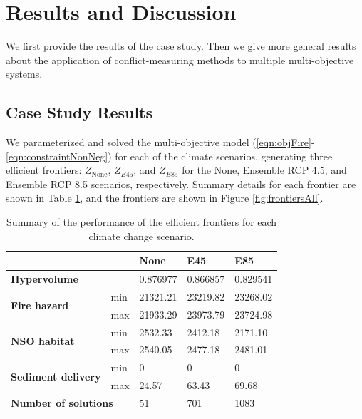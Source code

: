 \section{Results and Discussion}
\label{sec:results}
We first provide the results of the case study. Then we give more general results about the application of conflict-measuring methods to multiple multi-objective systems.

\subsection{Case Study Results}
We parameterized and solved the multi-objective model (\eqref{eqn:objFire}-\eqref{eqn:constraintNonNeg}) for each of the climate scenarios, generating three efficient frontiers: $Z_{\text{None}}$, $Z_{E45}$, and $Z_{E85}$ for the None, Ensemble RCP 4.5, and Ensemble RCP 8.5 scenarios, respectively. Summary details for each frontier are shown in Table \ref{tab:frontiersSummary}, and the frontiers are shown in Figure \ref{fig:frontiersAll}.

\begin{table}[]
\centering
\caption[Summary of efficient frontiers]{Summary of the performance of the efficient frontiers for each climate change scenario.}
\label{tab:frontiersSummary}
\begin{tabular}{ll|lll}
\multicolumn{2}{l|}{}                             & \textbf{None} & \textbf{E45} & \textbf{E85} \\ \hline
\multicolumn{2}{l|}{\textbf{Hypervolume}}         & 0.876977      & 0.866857     & 0.829541     \\ \hline
\multirow{2}{*}{\textbf{Fire hazard}}       & min & 21321.21      & 23219.82     & 23268.02     \\
                                            & max & 21933.29      & 23973.79     & 23724.98     \\ \hline
\multirow{2}{*}{\textbf{NSO habitat}}       & min & 2532.33       & 2412.18      & 2171.10      \\
                                            & max & 2540.05       & 2477.18      & 2481.01      \\ \hline
\multirow{2}{*}{\textbf{Sediment delivery}} & min & 0             & 0            & 0            \\
                                            & max & 24.57         & 63.43        & 69.68        \\ \hline
\multicolumn{2}{l|}{\textbf{Number of solutions}} & 51            & 701          & 1083        
\end{tabular}
\end{table}


